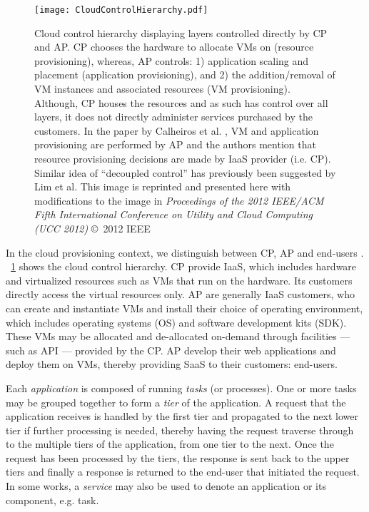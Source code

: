 \documentclass[10pt,journal,cspaper,compsoc]{IEEEtran}
\begin{document}
\begin{figure}[h!tb]
\centering
\texttt{[image: CloudControlHierarchy.pdf]}
\caption[Cloud control hierarchy]{Cloud control hierarchy displaying layers controlled directly by CP and AP. CP chooses the hardware to allocate VMs on (resource provisioning), whereas, AP controls: 1) application scaling and placement (application provisioning), and 2) the addition/removal of VM instances and associated resources (VM provisioning). Although, CP houses the resources and as such has control over all layers, it does not directly administer services purchased by the customers. In the paper by Calheiros et al. \cite{calheirosvirtual3}, VM and application provisioning are performed by AP and the authors mention that resource provisioning decisions are made by IaaS provider (i.e. CP). Similar idea of ``decoupled control'' \cite{2009_AutomatedControlCloudChallenges} has previously been suggested by Lim et al. This image is reprinted and presented here with modifications to the image in \emph{Proceedings of the 2012 IEEE/ACM Fifth International Conference on Utility and Cloud Computing (UCC 2012)} \cite{2012_ucc2012YasDas} \copyright\ 2012 IEEE}
\label{fig:cloudControlHierarchy}
\end{figure}

In the cloud provisioning context, we distinguish between CP, AP and end-users \cite{jimliwoodside2009performance5}. \figurename~\ref{fig:cloudControlHierarchy} shows the cloud control hierarchy. CP provide IaaS, which includes hardware and virtualized resources such as VMs that run on the hardware. Its customers directly access the virtual resources only. AP are generally IaaS customers, who can create and instantiate VMs and install their choice of operating environment, which includes operating systems (OS) and software development kits (SDK). These VMs may be allocated and de-allocated on-demand through facilities --- such as API --- provided by the CP. AP develop their web applications and deploy them on VMs, thereby providing SaaS to their customers: end-users.

Each \emph{application} is composed of running \emph{tasks} (or processes). One or more tasks may be grouped together to form a \emph{tier} of the application. A request that the application receives is handled by the first tier and propagated to the next lower tier if further processing is needed, thereby having the request traverse through to the multiple tiers of the application, from one tier to the next. Once the request has been processed by the tiers, the response is sent back to the upper tiers and finally a response is returned to the end-user that initiated the request. In some works, a \emph{service} may also be used to denote an application or its component, e.g. task.
\end{document}
